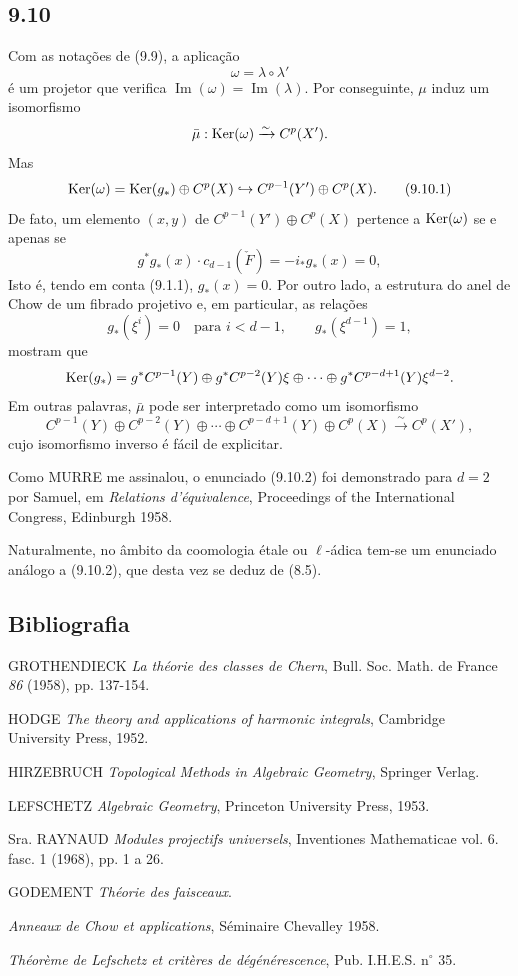 \subsection*{9.10}

Com as notações de (9.9), a aplicação
\[
\omega=\lambda\circ\lambda'
\]
é um projetor que verifica $\operatorname{Im}(\omega)=\operatorname{Im}(\lambda)$. Por conseguinte, $\mu$ induz um isomorfismo
\[
\bar\mu:\operatorname{Ker}(\omega)\xrightarrow{\sim}C^p(X').
\]
Mas
\[
\operatorname{Ker}(\omega)=\operatorname{Ker}(g_*)\oplus C^p(X)\hookrightarrow C^{p-1}(Y')\oplus C^p(X).
\tag{9.10.1}
\]
De fato, um elemento $(x,y)$ de $C^{p-1}(Y')\oplus C^p(X)$ pertence a $\operatorname{Ker}(\omega)$ se e apenas se
\[
g^*g_*(x)\cdot c_{d-1}(\check F)=-i_*g_*(x)=0,
\]
Isto é, tendo em conta (9.1.1), $g_*(x)=0$. Por outro lado, a estrutura do anel de Chow de um fibrado projetivo e, em particular, as relações
\[
g_*(\xi^i)=0\quad\text{para }i<d-1,\qquad g_*(\xi^{d-1})=1,
\]
mostram que
\[
\operatorname{Ker}(g_*)=g^*C^{p-1}(Y)\oplus g^*C^{p-2}(Y)\xi\oplus\cdots\oplus g^*C^{p-d+1}(Y)\xi^{d-2}.
\]
Em outras palavras, $\bar\mu$ pode ser interpretado como um isomorfismo
\[
C^{p-1}(Y)\oplus C^{p-2}(Y)\oplus\cdots\oplus C^{p-d+1}(Y)\oplus C^p(X)
\xrightarrow{\sim}C^p(X'),
\tag{9.10.2}
\]
cujo isomorfismo inverso é fácil de explicitar.

Como MURRE me assinalou, o enunciado (9.10.2) foi demonstrado para $d=2$ por Samuel, em \emph{Relations d'équivalence}, Proceedings of the International Congress, Edinburgh 1958.

Naturalmente, no âmbito da coomologia étale ou $\ell$-ádica tem-se um enunciado análogo a (9.10.2), que desta vez se deduz de (8.5).

\subsection*{Bibliografia}

\begin{enumerate}[label={[\arabic*]}]
\item GROTHENDIECK \emph{La théorie des classes de Chern}, Bull. Soc. Math. de France \emph{86} (1958), pp. 137-154.
\item HODGE \emph{The theory and applications of harmonic integrals}, Cambridge University Press, 1952.
\item HIRZEBRUCH \emph{Topological Methods in Algebraic Geometry}, Springer Verlag.
\item LEFSCHETZ \emph{Algebraic Geometry}, Princeton University Press, 1953.
\item Sra. RAYNAUD \emph{Modules projectifs universels}, Inventiones Mathematicae vol. 6. fasc. 1 (1968), pp. 1 a 26.
\item[{[TF]}] GODEMENT \emph{Théorie des faisceaux}.
\item[{[CH]}] \emph{Anneaux de Chow et applications}, Séminaire Chevalley 1958.
\item[{[6]}] \emph{Théorème de Lefschetz et critères de dégénérescence}, Pub. I.H.E.S. n$^\circ$ 35.
\end{enumerate}
